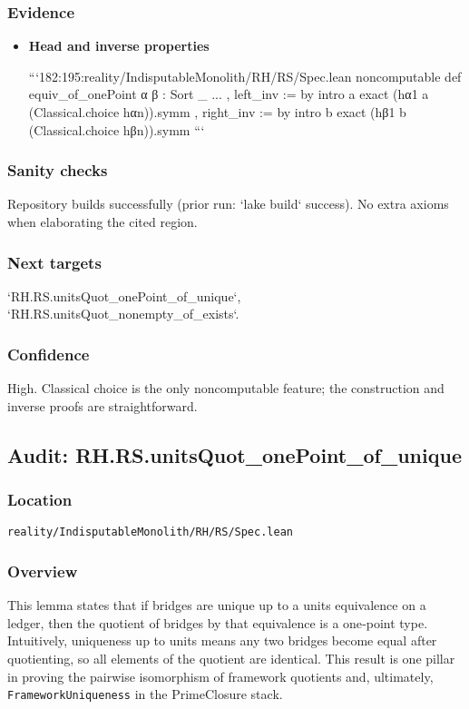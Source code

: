 \documentclass{article}
\newcommand{\FileRef}[1]{\texttt{#1}}
\begin{document}
\subsubsection{Evidence}
\begin{itemize}[leftmargin=*]
  \item \textbf{Head and inverse properties}

```182:195:reality/IndisputableMonolith/RH/RS/Spec.lean
noncomputable def equiv_of_onePoint {α β : Sort _} ...
, left_inv := by
    intro a
    exact (hα1 a (Classical.choice hαn)).symm
, right_inv := by
    intro b
    exact (hβ1 b (Classical.choice hβn)).symm
```
\end{itemize}

\subsubsection{Sanity checks}
Repository builds successfully (prior run: `lake build` success). No extra axioms when elaborating the cited region.

\subsubsection{Next targets}
`RH.RS.unitsQuot_onePoint_of_unique`, `RH.RS.unitsQuot_nonempty_of_exists`.

\subsubsection{Confidence}
High. Classical choice is the only noncomputable feature; the construction and inverse proofs are straightforward.


\subsection{Audit: RH.RS.unitsQuot\_onePoint\_of\_unique}
\subsubsection{Location}
\FileRef{reality/IndisputableMonolith/RH/RS/Spec.lean}

\subsubsection{Overview}
This lemma states that if bridges are unique up to a units equivalence on a ledger, then the quotient of bridges by that equivalence is a one‑point type. Intuitively, uniqueness up to units means any two bridges become equal after quotienting, so all elements of the quotient are identical. This result is one pillar in proving the pairwise isomorphism of framework quotients and, ultimately, \texttt{FrameworkUniqueness} in the PrimeClosure stack.
\end{document}
